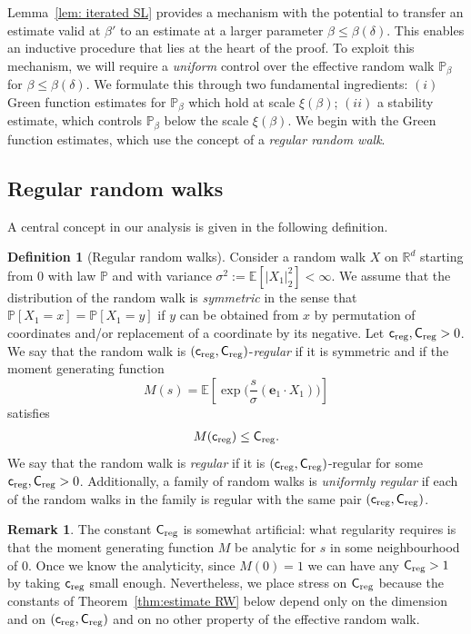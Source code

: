 \documentclass[11pt,a4paper]{article}
\numberwithin{equation}{section}
\theoremstyle{plain}
\theoremstyle{definition}
\newtheorem{Def}[Thm]{Definition}
\newtheorem{Rem}[Thm]{Remark}
\newcommand\1{\mathds{1}}
\newcommand\CM{\mathsf{C}_{\textup{reg}}}
\newcommand\cM{\mathsf{c}_{\textup{reg}}}
\newcommand\creg{\mathsf{c}_{\textup{reg}}}
\newcommand\Creg{\mathsf{C}_{\textup{reg}}}
\begin{document}
Lemma~\ref{lem: iterated SL} provides a mechanism with the potential to transfer an estimate
valid at $\beta'$ to an estimate at a larger parameter $\beta\leq \beta(\delta)$.
This enables an inductive procedure that lies at the heart of the proof.
To exploit this mechanism, we will require a \emph{uniform} control over the effective random walk $\mathbb P_\beta$ for $\beta\leq \beta(\delta)$. We formulate this through two fundamental ingredients: $(i)$ Green function estimates for $\mathbb P_\beta$ which hold at scale $\xi(\beta)$; $(ii)$ a stability estimate, which controls $\mathbb P_\beta$ below the scale $\xi(\beta)$. We begin with the Green function estimates, which use  
the  concept of a \emph{regular random walk}.

\subsection{Regular random walks}
\label{sec:regularRW}

A central concept in our analysis is given in the following definition.



\begin{Def}[Regular random walks]
\label{def:regularrw}
Consider a random walk $X$ on $\mathbb R^d$ starting from 0 with law $\mathbb P$
and with variance $\sigma^2:=\mathbb E[|X_1|_2^2]<\infty$.
We assume that the distribution of
the random walk is \emph{symmetric} in the sense that
$\mathbb P[X_1 =x] = \mathbb P[X_1 =y]$ if $y$ can be obtained from $x$ by
permutation of coordinates and/or replacement of a coordinate by its negative.
Let $\cM,\CM>0$.
We say that the
random walk is $(\cM,\CM)$-{\em regular} if
it is symmetric and if the moment generating function
\begin{equation}
    M(s) = \mathbb E \left[\exp\Big(\frac{s}{\sigma}(\mathbf{e}_1 \cdot X_1)\Big)\right]
\end{equation}
satisfies
\begin{align}
    M(\cM) \le \CM.
\end{align}
We say that the random walk is \emph{regular} if it is $(\cM,\CM)$-regular for some $\cM,\CM>0$. Additionally, a family of random walks is \emph{uniformly regular} if each of the random walks in the family is regular with the same pair $(\cM,\CM)$.
\end{Def}



\begin{Rem}
The constant $\Creg$ is somewhat artificial:
what regularity requires is that the moment generating function
$M$ be analytic for $s$ in some
neighbourhood of $0$.  Once we know the analyticity,
since $M(0)=1$ we can have any $\Creg >1$ by taking $\creg$ small enough.
Nevertheless, we place stress on $\Creg$ because the constants of
Theorem~\ref{thm:estimate RW} below depend only on the dimension and on
$(\creg,\Creg)$ and on no other property of the effective random walk.
\end{Rem}
\end{document}
